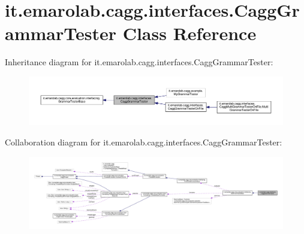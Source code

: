 \hypertarget{classit_1_1emarolab_1_1cagg_1_1interfaces_1_1CaggGrammarTester}{\section{it.\-emarolab.\-cagg.\-interfaces.\-Cagg\-Grammar\-Tester Class Reference}
\label{classit_1_1emarolab_1_1cagg_1_1interfaces_1_1CaggGrammarTester}
}


Inheritance diagram for it.\-emarolab.\-cagg.\-interfaces.\-Cagg\-Grammar\-Tester\-:\nopagebreak
\begin{figure}[H]
\begin{center}
\leavevmode
\includegraphics[width=350pt]{classit_1_1emarolab_1_1cagg_1_1interfaces_1_1CaggGrammarTester__inherit__graph}
\end{center}
\end{figure}


Collaboration diagram for it.\-emarolab.\-cagg.\-interfaces.\-Cagg\-Grammar\-Tester\-:\nopagebreak
\begin{figure}[H]
\begin{center}
\leavevmode
\includegraphics[width=350pt]{classit_1_1emarolab_1_1cagg_1_1interfaces_1_1CaggGrammarTester__coll__graph}
\end{center}
\end{figure}
